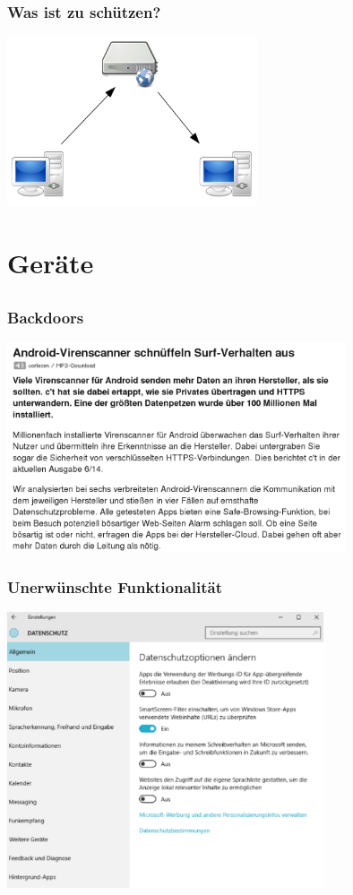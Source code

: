 \documentclass[12pt, xcolor={svgnames,table}]{beamer}
\begin{document}
\begin{frame}
    \frametitle{Was ist zu schützen?}
    \begin{center}
      \includegraphics[height=5cm]{img/c-s.png}
    \end{center}
\end{frame}

\section{Geräte}
\subsection{}

\begin{frame}
  \frametitle{Backdoors}
  \begin{center}
    \includegraphics[width=10cm]{img/backdoor-av}
  \par\end{center}
\end{frame}

\begin{frame}
    \frametitle{Unerwünschte Funktionalität}
    \begin{center}
      \includegraphics[width=0.7\textwidth]{img/windows10.png}
    \end{center}
\end{frame}
\end{document}

